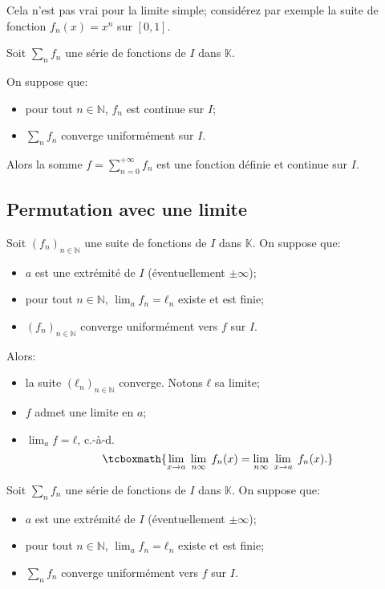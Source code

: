 \documentclass{yann}
\newcommand{\fn}{(f_n)_{n∈ℕ}}
\newcommand{\Sfn}{∑_n f_n}
\begin{document}

Cela n'est pas vrai pour la limite simple;
considérez par exemple la suite de fonction $f_n(x) = x^n$ sur $[0,1]$.


Soit $\Sfn$ une série de fonctions de $I$ dans $𝕂$.

On suppose que:
\begin{itemize}
\item
pour tout $n∈ℕ$, $f_n$ est continue sur $I$;
\item
$\Sfn$ converge uniformément sur $I$.
\end{itemize}

Alors la somme $f = ∑_{n=0}^{+∞} f_n$ est une fonction définie et continue sur $I$.

\subsection{Permutation avec une limite}\label{sec:perm-lim}


Soit $\fn$ une suite de fonctions de $I$ dans $𝕂$.
On suppose que:
\begin{itemize}
\item
$a$ est une extrémité de $I$ (éventuellement $±∞$);
\item
pour tout $n∈ℕ$, $\lim_a f_n = ℓ_n$ existe et est finie;
\item
$\fn$ converge uniformément vers $f$ sur $I$.
\end{itemize}

Alors:
\begin{itemize}
\item
la suite $(ℓ_n)_{n∈ℕ}$ converge. Notons $ℓ$ sa limite;
\item
$f$ admet une limite en $a$;
\item
$\lim_a f = ℓ$, c.-à-d.
  \[ \tcboxmath{
    \lim_{x\to a} \; \lim_\ninf \; f_n(x) = \lim_\ninf \; \lim_{x\to a} \; f_n(x).
  } \]
\end{itemize}


Soit $\Sfn$ une série de fonctions de $I$ dans $𝕂$.
On suppose que:
\begin{itemize}
\item
$a$ est une extrémité de $I$ (éventuellement $±∞$);
\item
pour tout $n∈ℕ$, $\lim_a f_n = ℓ_n$ existe et est finie;
\item
$\Sfn$ converge uniformément vers $f$ sur $I$.
\end{itemize}
\end{document}
